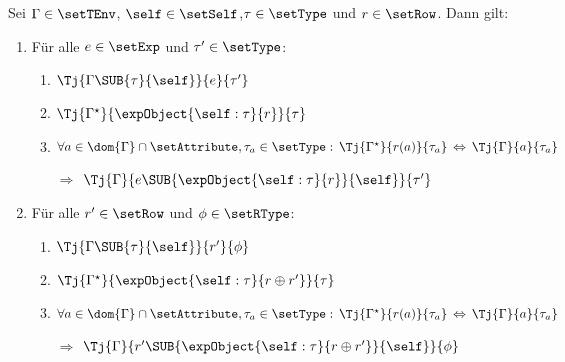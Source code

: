 \begin{lemma} \label{lemma:Lort:Typurteile_und_self_Substitution}
  Sei $\Gamma \in \setTEnv$, $\self\in\setSelf$,\linebreak[4] $\tau\in\setType$ und $r\in\setRow$. Dann gilt:
  \renewcommand{\labelenumii}{(\arabic{enumii})}
  \begin{enumerate}
    \item F\"ur alle $e\in\setExp$ und $\tau'\in\setType$:
          \begin{enumerate}
            \item $\Tj{\Gamma\SUB{\tau}{\self}}{e}{\tau'}$
            \item $\Tj{\Gamma^\star}{\expObject{\self:\tau}{r}}{\tau}$
            \item $\forall a\in\dom{\Gamma}\cap\setAttribute,\tau_a\in\setType:\,
                   \Tj{\Gamma^\star}{r(a)}{\tau_a}\,\Leftrightarrow\,\Tj{\Gamma}{a}{\tau_a}$
            \item[$\Rightarrow$] $\Tj{\Gamma}{e\SUB{\expObject{\self:\tau}{r}}{\self}}{\tau'}$
          \end{enumerate}

    \item F\"ur alle $r'\in\setRow$ und $\phi\in\setRType$:
          \begin{enumerate}
            \item $\Tj{\Gamma\SUB{\tau}{\self}}{r'}{\phi}$
            \item $\Tj{\Gamma^\star}{\expObject{\self:\tau}{r \oplus r'}}{\tau}$
            \item $\forall a\in\dom{\Gamma}\cap\setAttribute,\tau_a\in\setType:\,
                   \Tj{\Gamma^\star}{r(a)}{\tau_a}\,\Leftrightarrow\,\Tj{\Gamma}{a}{\tau_a}$
            \item[$\Rightarrow$] $\Tj{\Gamma}{r'\SUB{\expObject{\self:\tau}{r \oplus r'}}{\self}}{\phi}$
          \end{enumerate}
  \end{enumerate}
  \renewcommand{\labelenumii}{\arabic{enumii}.}
\end{lemma}

